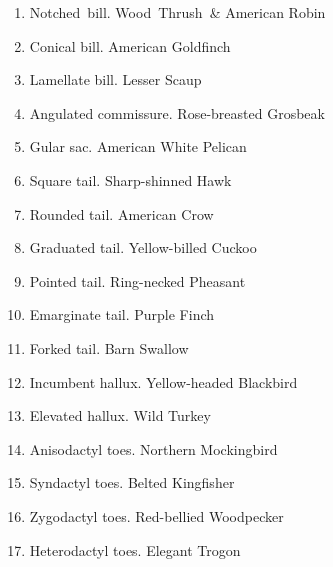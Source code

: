 \documentclass[11pt]{article}
\begin{document}
\begin{multicols}{2}
\begin{enumerate}[itemsep=1cm]
\item Notched~bill. Wood~Thrush~\& American Robin
\item Conical bill. \newline American Goldfinch
\item Lamellate bill. \newline Lesser Scaup
\item Angulated commissure. \newline Rose-breasted Grosbeak
\item Gular sac. \newline American White Pelican

\item Square tail. \newline Sharp-shinned Hawk
\item Rounded tail. \newline American Crow
\item Graduated tail. \newline Yellow-billed Cuckoo
\item Pointed tail. \newline Ring-necked Pheasant
\item Emarginate tail. \newline Purple Finch
\item Forked tail. \newline Barn Swallow

\item Incumbent hallux. \newline Yellow-headed Blackbird
\item Elevated hallux. \newline Wild Turkey
\item Anisodactyl toes. \newline Northern Mockingbird
\item Syndactyl toes. \newline Belted Kingfisher
\item Zygodactyl toes. \newline Red-bellied Woodpecker
\item Heterodactyl toes. \newline Elegant Trogon


\end{enumerate}
\end{multicols}
\end{document}

